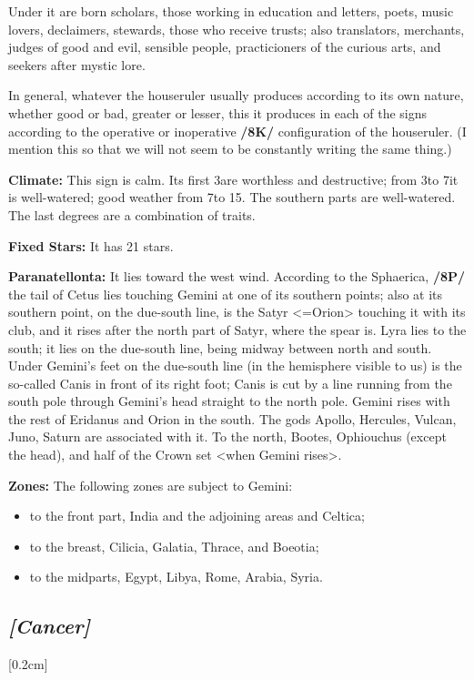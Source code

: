 Under it are born scholars, those working in education and letters, poets, music lovers, declaimers, stewards, those who receive trusts; also translators, merchants, judges of good and evil, sensible people, practicioners of the curious arts, and seekers after mystic lore. 

\mndl[0.2cm]
In general, whatever the houseruler usually produces according to its own nature, whether good or bad, greater or lesser, this it produces in each of the signs according to the operative or inoperative \textbf{/8K/} configuration of the houseruler. (I mention this so that we will not seem to be constantly writing the same thing.)

\textbf{Climate:} This sign is calm. Its first 3\deg are worthless and destructive; from 3\deg to 7\deg it is well-watered; good weather from 7\deg to 15\deg. The southern parts are well-watered. The last degrees are a combination of traits.

\textbf{Fixed Stars:} It has 21 stars. 

\textbf{Paranatellonta:} It lies toward the west wind. According to the Sphaerica, \textbf{/8P/} the tail of Cetus lies touching Gemini at one of its southern points; also at its southern point, on the due-south line, is the Satyr
<=Orion> touching it with its club, and it rises after the north part of Satyr, where the spear is. Lyra lies to the south; it lies on the due-south line, being midway between north and south. Under Gemini’s feet on the due-south line (in the hemisphere visible to us) is the so-called Canis in front of its right foot; Canis is cut by a line running from the south pole through Gemini's head straight to the north pole. 
Gemini rises with the rest of Eridanus and Orion in the south. The gods Apollo, Hercules, Vulcan, Juno, Saturn are associated with it. To the north, Bootes, Ophiouchus (except the head), and half of the Crown set <when
Gemini rises>. 

\textbf{Zones:} The following zones are subject to Gemini: 
\begin{itemize}
\item to the front part, India and the adjoining areas
and Celtica; 
\item to the breast, Cilicia, Galatia, Thrace, and Boeotia; 
\item to the midparts, Egypt, Libya, Rome, Arabia, Syria.
\end{itemize}

\secbr
\subsection{\textit{[Cancer]}}
[0.2cm]

